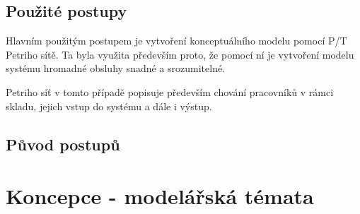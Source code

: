 \documentclass[11pt]{article}
\begin{document}
	\subsection{Použité postupy}
	Hlavním použitým postupem je vytvoření konceptuálního modelu\cite[str.~48]{ims-prezentace} pomocí P/T Petriho sítě\cite[str.~123]{ims-prezentace}.
	Ta byla využita především proto, že pomocí ní je vytvoření modelu systému hromadné obsluhy\cite[str.~136]{ims-prezentace} snadné a srozumitelné.
	
	Petriho síť v tomto případě popisuje především chování pracovníků v rámci skladu, jejich vstup do systému a dále i výstup.
	
	\subsection{Původ postupů}
	
	
	
	\section{Koncepce - modelářská témata}
	
	
	
	
\end{document}
